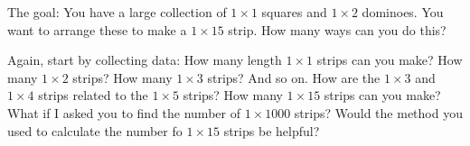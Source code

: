 \documentclass[11pt]{exam}
\begin{document}
The goal: You have a large collection of $1\times 1$ squares and $1\times 2$ dominoes.  You want to arrange these to make a $1 \times 15$ strip.  How many ways can you do this?
\begin{questions}
  \question Again, start by collecting data: How many length $1\times 1$ strips can you make?  How many $1\times 2$ strips?  How many $1\times 3$ strips?  And so on.
  \vfill
  \question How are the $1\times 3$ and $1 \times 4$ strips related to the $1\times 5$ strips?  
  \vfill
  \question How many $1\times 15$ strips can you make?
  \vfill
  \vfill
  \question What if I asked you to find the number of $1\times 1000$ strips?  Would the method you used to calculate the number fo  $1 \times 15$ strips be helpful?  
\end{questions}
\end{document}
